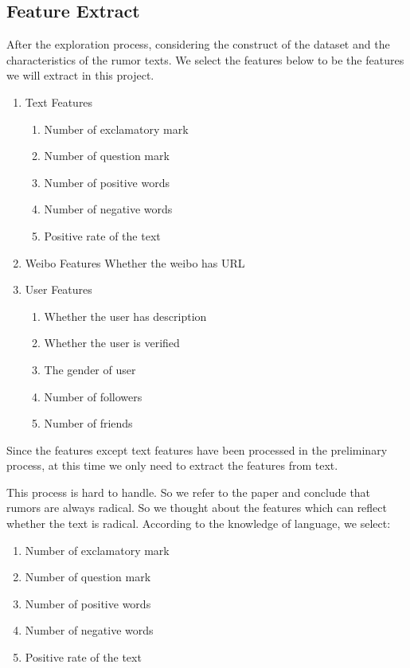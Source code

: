 \documentclass[12pt,a4paper]{article}
\begin{document}
\subsection{Feature Extract}
After the exploration process, considering the construct of the dataset and the characteristics of the rumor texts. We select the features below to be the features we will extract in this project.
\begin{enumerate}
	\item Text Features
	\begin{enumerate}
		\item Number of exclamatory mark
		\item Number of question mark
		\item Number of positive words
		\item Number of negative words
		\item Positive rate of the text
	\end{enumerate}
	
	\item Weibo Features
	Whether the weibo has URL
	\item User Features
	\begin{enumerate}
		\item Whether the user has description
		\item Whether the user is verified
		\item The gender of user
		\item Number of followers
		\item Number of friends
	\end{enumerate}
	
\end{enumerate}

Since the features except text features have been processed in the preliminary process, at this time we only need to extract the features from text.

This process is hard to handle. So we refer to the paper and conclude that rumors are always radical. So we thought about the features which can reflect whether the text is radical. According to the knowledge of language, we select:
\begin{enumerate}
	\item Number of exclamatory mark
	\item 	Number of question mark
	\item 	Number of positive words
	\item 	Number of negative words
	\item 	Positive rate of the text
\end{enumerate}
\end{document}
